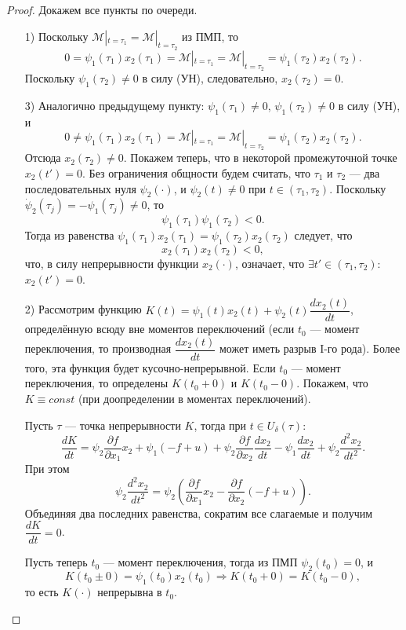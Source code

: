 \documentclass[12pt, a4paper]{article}
\theoremstyle{rusdef}
\renewcommand{\d}{\partial} %
\DeclareMathOperator*{\thus}{\Rightarrow} %
\begin{document}
\begin{proof}
  Докажем все пункты по очереди.
  \begin{enumerate}
    \item[1)] Поскольку $\mathscr{M}|_{t=\tau_1} = \mathscr{M}|_{t=\tau_2}$ из ПМП, то
    $$
      0 = \psi_1(\tau_1) x_2(\tau_1) = \mathscr{M}|_{t=\tau_1} = \mathscr{M}|_{t=\tau_2} = \psi_1(\tau_2) x_2(\tau_2).
    $$
    Поскольку $\psi_1(\tau_2) \neq 0$ в силу (УН), следовательно, $x_2(\tau_2) = 0$.
    
    \item[3)] Аналогично предыдущему пункту: $\psi_1(\tau_1) \neq 0$, $\psi_1(\tau_2) \neq 0$ в силу (УН), и
    $$
      0 \neq \psi_1(\tau_1) x_2(\tau_1) = \mathscr{M}|_{t=\tau_1} = \mathscr{M}|_{t=\tau_2} = \psi_1(\tau_2) x_2(\tau_2).
    $$
    Отсюда $x_2(\tau_2) \neq 0$. Покажем теперь, что в некоторой промежуточной точке $x_2(t') = 0$.
    Без ограничения общности будем считать, что $\tau_1$ и $\tau_2$ --- два последовательных нуля $\psi_2(\cdot)$, и $\psi_2(t) \neq 0$ при $t \in (\tau_1, \tau_2)$.
    Поскольку $\dot{\psi}_2(\tau_j) = -\psi_1(\tau_j) \neq 0$, то 
    $$
      \psi_1(\tau_1) \psi_1(\tau_2) < 0.
    $$
    Тогда из равенства $\psi_1(\tau_1) x_2(\tau_1) = \psi_1(\tau_2) x_2(\tau_2)$ следует, что
    $$
      x_2(\tau_1) x_2(\tau_2) < 0,
    $$
    что, в силу непрерывности функции $x_2(\cdot)$, означает, что $\exists t' \in (\tau_1, \tau_2)\colon$ $x_2(t') = 0$.
    \item[2)] Рассмотрим функцию $K(t) = \psi_1(t) x_2(t) + \psi_2(t) \dfrac{dx_2(t)}{dt}$, определённую всюду вне моментов переключений (если $t_0$ --- момент переключения, то производная $\dfrac{dx_2(t)}{dt}$ может иметь разрыв I-го рода). Более того, эта функция будет кусочно-непрерывной.
    Если $t_0$ --- момент переключения, то определены $K(t_0+0)$ и $K(t_0-0)$. Покажем, что $K \equiv const$ (при доопределении в моментах переключений).

    Пусть $\tau$ --- точка непрерывности $K$, тогда при $t \in U_{\delta}(\tau)$:
    $$
      \dfrac{dK}{dt} = \psi_2 \dfrac{\d f}{\d x_1} x_2 + \psi_1(-f + u) + \psi_2 \dfrac{\d f}{\d x_2} \dfrac{dx_2}{dt} - \psi_1 \dfrac{dx_2}{dt} + \psi_2 \dfrac{d^2 x_2}{dt^2}.
    $$
    При этом
    $$
      \psi_2 \dfrac{d^2 x_2}{dt^2} = \psi_2 \left( \dfrac{\d f}{\d x_1} x_2 - \dfrac{\d f}{\d x_2}(-f + u) \right).
    $$
    Объединяя два последних равенства, сократим все слагаемые и получим $\dfrac{dK}{dt} = 0$.

    Пусть теперь $t_0$ --- момент переключения, тогда из ПМП $\psi_2(t_0) = 0$, и
    $$
      K(t_0 \pm 0) = \psi_1(t_0) x_2(t_0) \thus K(t_0 + 0) = K(t_0 - 0), 
    $$
    то есть $K(\cdot)$ непрерывна в $t_0$.


\end{enumerate}
\end{proof}
\end{document}
